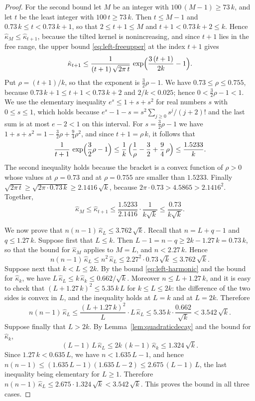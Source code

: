\documentclass{amsart}
\theoremstyle{definition}
\theoremstyle{remark}
\numberwithin{equation}{section}
\begin{document}
\begin{proof}
For the second bound let $M$ be an integer with $100\,(M-1)\ge 73\,k$, and let $t$ be the least integer with $100\,t\ge 73\,k$. Then $t\le M-1$ and $0.73\,k\le t<0.73\,k+1$, so that $2\le t+1\le M$ and $t+1<0.73\,k+2\le k$. Hence $\hat\kappa_M\le\hat\kappa_{t+1}$, because the tilted kernel is nonincreasing, and since $t+1$ lies in the free range, the upper bound \eqref{eq:left-freeupper} at the index $t+1$ gives
\[
\hat\kappa_{t+1}\le\frac{1}{(t+1)\,\sqrt{2\pi\,t}}\,\exp\Bigl(\frac{3\,(t+1)}{2k}-1\Bigr).
\]
Put $\rho=(t+1)/k$, so that the exponent is $\frac32\rho-1$. We have $0.73\le\rho\le 0.755$, because $0.73\,k+1\le t+1<0.73\,k+2$ and $2/k<0.025$; hence $0<\frac32\rho-1<1$. We use the elementary inequality $e^{s}\le 1+s+s^{2}$ for real numbers $s$ with $0\le s\le 1$, which holds because $e^{s}-1-s=s^{2}\sum_{j\ge 0}s^{j}/(j+2)!$ and the last sum is at most $e-2<1$ on this interval. For $s=\frac32\rho-1$ we have $1+s+s^{2}=1-\frac32\rho+\frac94\rho^{2}$, and since $t+1=\rho\,k$, it follows that
\[
\frac{1}{t+1}\,\exp\Bigl(\frac32\rho-1\Bigr)\le\frac{1}{k}\,\Bigl(\frac1\rho-\frac32+\frac94\,\rho\Bigr)\le\frac{1.5233}{k}.
\]
The second inequality holds because the bracket is a convex function of $\rho>0$ whose values at $\rho=0.73$ and at $\rho=0.755$ are smaller than $1.5233$. Finally $\sqrt{2\pi\,t}\ge\sqrt{2\pi\cdot 0.73\,k}\ge 2.1416\,\sqrt k$, because $2\pi\cdot 0.73>4.5865>2.1416^2$. Together,
\[
\hat\kappa_M\le\hat\kappa_{t+1}\le\frac{1.5233}{2.1416}\cdot\frac{1}{k\sqrt k}\le\frac{0.73}{k\sqrt k}.
\]

We now prove that $n(n-1)\,\hat\kappa_L\le 3.762\,\sqrt k$. Recall that $n=L+q-1$ and $q\le 1.27\,k$. Suppose first that $L\le k$. Then $L-1=n-q\ge 2k-1.27\,k=0.73\,k$, so that the bound for $\hat\kappa_M$ applies to $M=L$, and $n<2.27\,k$. Hence
\[
n(n-1)\,\hat\kappa_L\le n^2\,\hat\kappa_L\le 2.27^2\cdot 0.73\,\sqrt k\le 3.762\,\sqrt k .
\]
Suppose next that $k<L\le 2k$. By the bound \eqref{eq:left-harmonic} and the bound for $\hat\kappa_k$, we have $L\,\hat\kappa_L\le k\,\hat\kappa_k\le 0.662/\sqrt k$. Moreover $n\le L+1.27\,k$, and it is easy to check that $(L+1.27\,k)^2\le 5.35\,k\,L$ for $k\le L\le 2k$: the difference of the two sides is convex in $L$, and the inequality holds at $L=k$ and at $L=2k$. Therefore
\[
n(n-1)\,\hat\kappa_L\le\frac{(L+1.27\,k)^2}{L}\cdot L\,\hat\kappa_L\le 5.35\,k\cdot\frac{0.662}{\sqrt k}<3.542\,\sqrt k .
\]
Suppose finally that $L>2k$. By Lemma~\ref{lem:quadraticdecay} and the bound for $\hat\kappa_k$,
\[
(L-1)\,L\,\hat\kappa_L\le 2k\,(k-1)\,\hat\kappa_k\le 1.324\,\sqrt k .
\]
Since $1.27\,k<0.635\,L$, we have $n<1.635\,L-1$, and hence $n(n-1)\le(1.635\,L-1)(1.635\,L-2)\le 2.675\,(L-1)\,L$, the last inequality being elementary for $L\ge 1$. Therefore $n(n-1)\,\hat\kappa_L\le 2.675\cdot 1.324\,\sqrt k<3.542\,\sqrt k$. This proves the bound in all three cases.


\end{proof}
\end{document}
